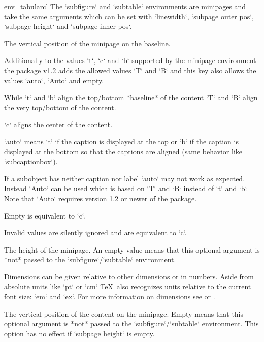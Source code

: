 \begin{tableobject}{env=tabular}{cl}
  The `subfigure` and `subtable` environments are minipages and take the same arguments
  which can be set with `linewidth`, `subpage outer pos`, `subpage height` and `subpage inner pos`.

  The vertical position of the minipage on the baseline.

  Additionally to the values `t`, `c` and `b` supported by the minipage environment
  the  package v1.2 adds the allowed values `T` and `B`
  and this key also allows the values `auto`, `Auto` and empty.

  While `t` and `b` align the top\slash bottom *baseline* of the content
  `T` and `B` align the very top\slash bottom of the content.

  `c` aligns the center of the content.

  `auto` means `t` if the caption is displayed at the top
  or `b` if the caption is displayed at the bottom
  so that the captions are aligned
  (same behavior like `subcaptionbox`).

  If a subobject has neither caption nor label `auto` may not work as expected.
  Instead `Auto` can be used which is based on `T` and `B` instead of `t` and `b`.
  Note that `Auto` requires version 1.2 or newer of the  package.

  Empty is equivalent to `c`.

  Invalid values are silently ignored and are equivalent to `c`.


  The height of the minipage.
  An empty value means that this optional argument is
  *not* passed to the `subfigure`\slash `subtable` environment.

  Dimensions can be given relative to other dimensions or in numbers.
  Aside from absolute units like `pt` or `cm` \TeX\ also recognizes units relative to the current font size: `em` and `ex`.
  For more information on dimensions see  or .

  The vertical position of the content on the minipage.
  Empty means that this optional argument is
  *not* passed to the `subfigure`\slash `subtable` environment.
  This option has no effect if `subpage height` is empty.



\end{tableobject}
